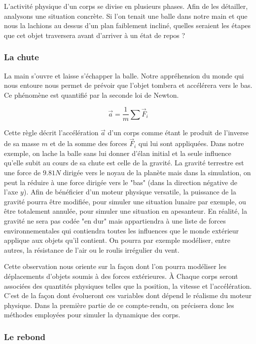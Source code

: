 L'activité physique d'un corps se divise en plusieurs phases. Afin de les détailler, analysons une situation concrète. Si l'on tenait une balle dans notre main et que nous la lachions au dessus d'un plan faiblement incliné, quelles seraient les étapes que cet objet traversera avant d'arriver à un état de repos ?

\subsubsection{La chute}

La main s'ouvre et laisse s'échapper la balle. Notre appréhension du monde qui nous entoure nous permet de prévoir que l'objet tombera et accélérera vers le bas. Ce phénomène est quantifié par la seconde loi de Newton.

\[
\vec{a} = \frac{1}{m} \sum{\vec{F}_i}
\]

Cette règle décrit l'accélération $\vec{a}$ d'un corps comme étant le produit de l'inverse de sa masse $m$ et de la somme des forces $\vec{F}_i$ qui lui sont appliquées. Dans notre exemple, on lache la balle sans lui donner d'élan initial et la seule influence qu'elle subit au cours de sa chute est celle de la gravité. La gravité terrestre est une force de $9.81 N$ dirigée vers le noyau de la planète mais dans la simulation, on peut la réduire à une force dirigée vers le "bas" (dans la direction négative de l'axe $y$). Afin de bénéficier d'un moteur physique versatile, la puissance de la gravité pourra être modifiée, pour simuler une situation lunaire par exemple, ou être totalement annulée, pour simuler une situation en apesanteur. En réalité, la gravité ne sera pas codée "en dur" mais appartiendra à une liste de forces environnementales qui contiendra toutes les influences que le monde extérieur applique aux objets qu'il contient. On pourra par exemple modéliser, entre autres, la résistance de l'air ou le roulis irrégulier du vent.

Cette observation nous oriente sur la façon dont l'on pourra modéliser les déplacements d'objets soumis à des forces extérieures. \`A Chaque corps seront associées des quantités physiques telles que la position, la vitesse et l'accélération. C'est de la façon dont évolueront ces variables dont dépend le réalisme du moteur physique. Dans la première partie de ce compte-rendu, on précisera donc les méthodes employées pour simuler la dynamique des corps.

\subsubsection{Le rebond}

